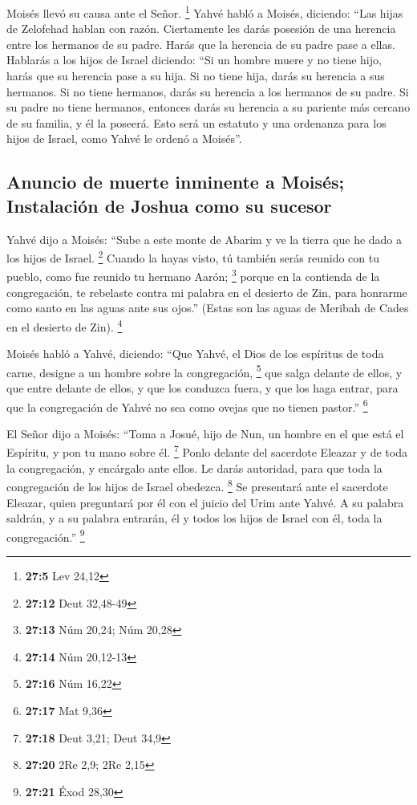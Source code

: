  Moisés llevó su causa ante el Señor. \footnote{\textbf{27:5}
  Lev 24,12}  Yahvé habló a Moisés, diciendo:
 ``Las hijas de Zelofehad hablan con razón. Ciertamente
les darás posesión de una herencia entre los hermanos de su padre. Harás
que la herencia de su padre pase a ellas.  Hablarás a los
hijos de Israel diciendo: ``Si un hombre muere y no tiene hijo, harás
que su herencia pase a su hija.  Si no tiene hija, darás
su herencia a sus hermanos.  Si no tiene hermanos, darás
su herencia a los hermanos de su padre.  Si su padre no
tiene hermanos, entonces darás su herencia a su pariente más cercano de
su familia, y él la poseerá. Esto será un estatuto y una ordenanza para
los hijos de Israel, como Yahvé le ordenó a Moisés''.

\hypertarget{anuncio-de-muerte-inminente-a-moisuxe9s-instalaciuxf3n-de-joshua-como-su-sucesor}{%
\subsection{Anuncio de muerte inminente a Moisés; Instalación de Joshua
como su
sucesor}\label{anuncio-de-muerte-inminente-a-moisuxe9s-instalaciuxf3n-de-joshua-como-su-sucesor}}

 Yahvé dijo a Moisés: ``Sube a este monte de Abarim y ve
la tierra que he dado a los hijos de Israel. \footnote{\textbf{27:12}
  Deut 32,48-49}  Cuando la hayas visto, tú también serás
reunido con tu pueblo, como fue reunido tu hermano Aarón; \footnote{\textbf{27:13}
  Núm 20,24; Núm 20,28}  porque en la contienda de la
congregación, te rebelaste contra mi palabra en el desierto de Zin, para
honrarme como santo en las aguas ante sus ojos.'' (Estas son las aguas
de Meribah de Cades en el desierto de Zin). \footnote{\textbf{27:14} Núm
  20,12-13}

 Moisés habló a Yahvé, diciendo:  ``Que
Yahvé, el Dios de los espíritus de toda carne, designe a un hombre sobre
la congregación, \footnote{\textbf{27:16} Núm 16,22}  que
salga delante de ellos, y que entre delante de ellos, y que los conduzca
fuera, y que los haga entrar, para que la congregación de Yahvé no sea
como ovejas que no tienen pastor.'' \footnote{\textbf{27:17} Mat 9,36}

 El Señor dijo a Moisés: ``Toma a Josué, hijo de Nun, un
hombre en el que está el Espíritu, y pon tu mano sobre él. \footnote{\textbf{27:18}
  Deut 3,21; Deut 34,9}  Ponlo delante del sacerdote
Eleazar y de toda la congregación, y encárgalo ante ellos.
 Le darás autoridad, para que toda la congregación de los
hijos de Israel obedezca. \footnote{\textbf{27:20} 2Re 2,9; 2Re 2,15}
 Se presentará ante el sacerdote Eleazar, quien
preguntará por él con el juicio del Urim ante Yahvé. A su palabra
saldrán, y a su palabra entrarán, él y todos los hijos de Israel con él,
toda la congregación.'' \footnote{\textbf{27:21} Éxod 28,30}

